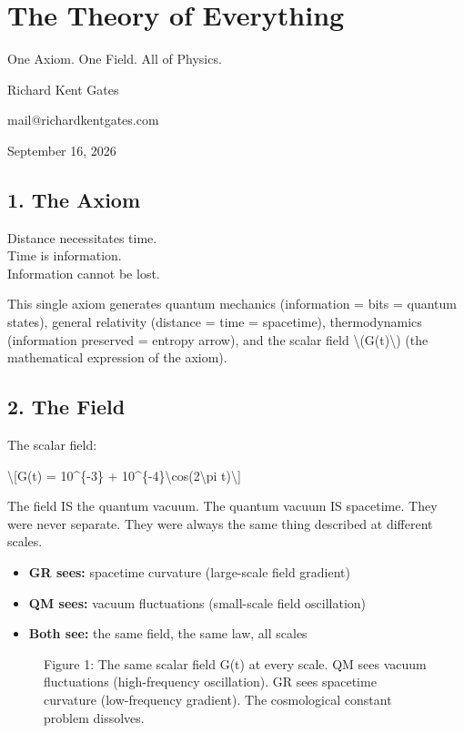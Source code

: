 \documentclass[
  10pt,
]{article}
\author{}
\date{}
\providecommand{\tightlist}{%
  \setlength{\itemsep}{0pt}\setlength{\parskip}{0pt}}
\begin{document}
\hypertarget{the-theory-of-everything}{%
\section{The Theory of Everything}\label{the-theory-of-everything}}

One Axiom. One Field. All of Physics.

Richard Kent Gates

mail@richardkentgates.com

September 16, 2026

\hypertarget{the-axiom}{%
\subsection{1. The Axiom}\label{the-axiom}}

Distance necessitates time.\\
Time is information.\\
Information cannot be lost.

This single axiom generates quantum mechanics (information = bits =
quantum states), general relativity (distance = time = spacetime),
thermodynamics (information preserved = entropy arrow), and the scalar
field \textbackslash(G(t)\textbackslash) (the mathematical expression of
the axiom).

\hypertarget{the-field}{%
\subsection{2. The Field}\label{the-field}}

The scalar field:

\textbackslash{[}G(t) = 10\^{}\{-3\} +
10\^{}\{-4\}\textbackslash cos(2\textbackslash pi t)\textbackslash{]}

The field IS the quantum vacuum. The quantum vacuum IS spacetime. They
were never separate. They were always the same thing described at
different scales.

\begin{itemize}
\tightlist
\item
  \textbf{GR sees:} spacetime curvature (large-scale field gradient)
\item
  \textbf{QM sees:} vacuum fluctuations (small-scale field oscillation)
\item
  \textbf{Both see:} the same field, the same law, all scales
\end{itemize}

\begin{figure}
\centering

\caption{Figure 1: The same scalar field G(t) at every scale. QM sees
vacuum fluctuations (high-frequency oscillation). GR sees spacetime
curvature (low-frequency gradient). The cosmological constant problem
dissolves.}
\end{figure}
\end{document}
